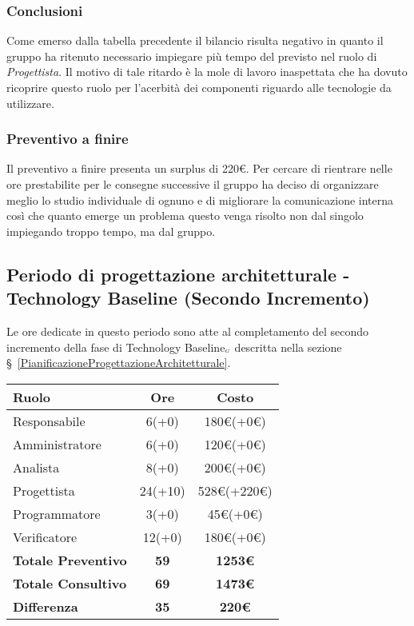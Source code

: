 {{{{\subsubsection{Conclusioni}
Come emerso dalla tabella precedente il bilancio risulta negativo in quanto il gruppo ha ritenuto necessario impiegare più tempo del previsto nel ruolo di \textit{Progettista}. Il motivo di tale ritardo è la mole di lavoro inaspettata che ha dovuto ricoprire questo ruolo per l'acerbità dei componenti riguardo alle tecnologie da utilizzare.

\subsubsection{Preventivo a finire}
Il preventivo a finire presenta un surplus di 220\euro. Per cercare di rientrare nelle ore prestabilite per le consegne successive il gruppo ha deciso di organizzare meglio lo studio individuale di ognuno e di migliorare la comunicazione interna così che quanto emerge un problema questo venga risolto non dal singolo impiegando troppo tempo, ma dal gruppo.

\subsection{Periodo di progettazione architetturale - Technology Baseline (Secondo Incremento)}\label{ConsuntivoPeriodoDiProgettazioneArchitetturaleTechnologyBaselineSecondoIncremento}

Le ore dedicate in questo periodo sono atte al completamento del secondo incremento della fase di Technology Baseline$_{\scaleto{G}{3pt}}$ descritta nella sezione \S~\ref{PianificazioneProgettazioneArchitetturale}.

\quad
\def\tabularxcolumn#1{m{#1}}
{
	\begin{center}
		\renewcommand{\arraystretch}{1.4}
		\begin{tabularx}{10cm}{|X|c|c|}
			\hline
			\rowcolor{airforceblue}
			\textbf{Ruolo} & \textbf{Ore} & \textbf{Costo}\\
			\hline
			Responsabile & 6(+0) & 180\euro(+0\euro)\\
			\hline
			Amministratore & 6(+0) & 120\euro(+0\euro)\\
			\hline
			Analista & 8(+0) & 200\euro(+0\euro)\\
			\hline
			Progettista & 24(+10) & 528\euro(+220\euro)\\
			\hline
			Programmatore & 3(+0) & 45\euro(+0\euro)\\
			\hline
			Verificatore & 12(+0) & 180\euro(+0\euro)\\
			\hline
			\textbf{Totale Preventivo} & \textbf{59} & \textbf{1253\euro}\\
			\hline
			\textbf{Totale Consultivo} & \textbf{69} & \textbf{1473\euro}\\
			\hline
			\textbf{Differenza} & \textbf{35} & \textbf{220\euro}
		\end{tabularx}
	\end{center}

}}}}}
